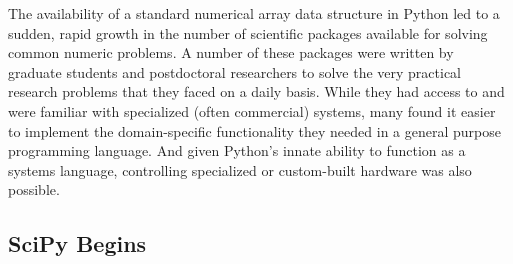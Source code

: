 \documentclass[fleqn,10pt]{wlscirep}
\begin{document}
The availability of a standard numerical array data structure in
Python led to a sudden, rapid growth in the number of scientific
packages available for solving common numeric problems.
A number of these packages were written by graduate students and
postdoctoral researchers to solve the very practical research problems
that they faced on a daily basis.  While they had access to and were
familiar with specialized (often commercial) systems, many found
it easier to implement the domain-specific functionality they needed
in a general purpose programming language.  And given Python's innate
ability to function as a systems language, controlling specialized or
custom-built hardware was also possible.


%




\subsection*{SciPy Begins}
\end{document}
